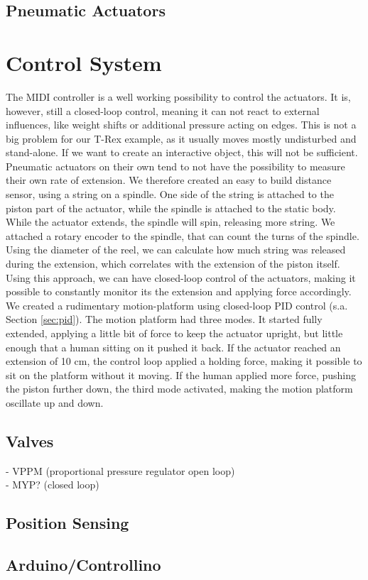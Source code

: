 \subsection{Pneumatic Actuators}

\section{Control System}
The MIDI controller is a well working possibility to control the actuators. It is, however, still a closed-loop control, meaning it can not react to external influences, like weight shifts or additional pressure acting on edges. This is not a big problem for our T-Rex example, as it usually moves mostly undisturbed and stand-alone. If we want to create an interactive object, this will not be sufficient.\\
Pneumatic actuators on their own tend to not have the possibility to measure their own rate of extension. We therefore created an easy to build distance sensor, using a string on a spindle. One side of the string is attached to the piston part of the actuator, while the spindle is attached to the static body. While the actuator extends, the spindle will spin, releasing more string. We attached a rotary encoder to the spindle, that can count the turns of the spindle. Using the diameter of the reel, we can calculate how much string was released during the extension, which correlates with the extension of the piston itself.\\
Using this approach, we can have closed-loop control of the actuators, making it possible to constantly monitor its the extension and applying force accordingly.\\
We created a rudimentary motion-platform using closed-loop PID control (s.a. Section \ref{sec:pid}). The motion platform had three modes. It started fully extended, applying a little bit of force to keep the actuator upright, but little enough that a human sitting on it pushed it back. If the actuator reached an extension of 10 cm, the control loop applied a holding force, making it possible to sit on the platform without it moving. If the human applied more force, pushing the piston further down, the third mode activated, making the motion platform oscillate up and down.

\subsection{Valves}
- VPPM (proportional pressure regulator open loop)\\
- MYP? (closed loop)

\subsection{Position Sensing}

\subsection{Arduino/Controllino}
